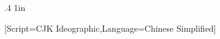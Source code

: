 


\xpatchcmd\footnoterule
  {.4\columnwidth}
  {1in}
  {}{\fail}



\newfontfamily{}[Script=CJK Ideographic,Language=Chinese Simplified]

\newcommand{\footnotespacefix}{\hspace{-0.5\ccwd}}

\usepackage{scrextend} %





\renewcommand{\thefootnote}{{\footnotefont\makexeCJKinactive\hspace{-0.5\ccwd}〔\arabic{footnote}〕\hspace{-0.5\ccwd}\makexeCJKactive}}





